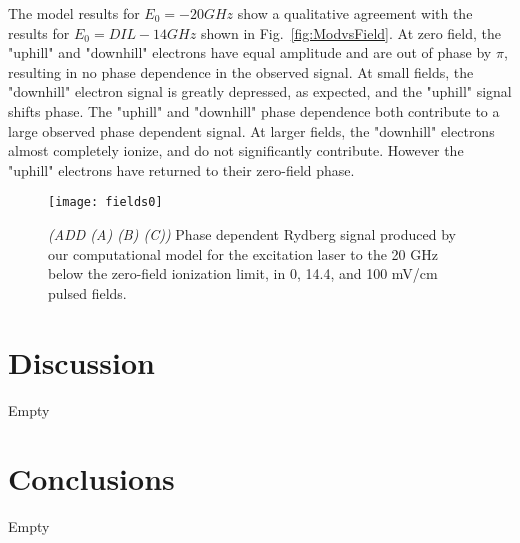 \documentclass[aps,pra,preprint,groupedaddress]{revtex4-1}
\begin{document}
The model results for $E_0 = -20 GHz$ show a qualitative agreement with the results for $E_0 = DIL - 14 GHz$ shown in Fig.~\ref{fig:ModvsField}. At zero field, the "uphill" and "downhill" electrons have equal amplitude and are out of phase by $\pi$, resulting in no phase dependence in the observed signal. At small fields, the "downhill" electron signal is greatly depressed, as expected, and the "uphill" signal shifts phase. The "uphill" and "downhill" phase dependence both contribute to a large observed phase dependent signal. At larger fields, the "downhill" electrons almost completely ionize, and do not significantly contribute. However the "uphill" electrons have returned to their zero-field phase.

\begin{figure}
	\texttt{[image: fields0]}
	\caption{\emph{(ADD (A) (B) (C))} Phase dependent Rydberg signal produced by our computational model for the excitation laser to the 20 GHz below the zero-field ionization limit, in 0, 14.4, and 100 mV/cm pulsed fields.}
	\label{fig:SimModBelow}
\end{figure}

\section{\label{sec:disc} Discussion}

Empty

\section{\label{sec:conc} Conclusions}

Empty


%
\end{document}
